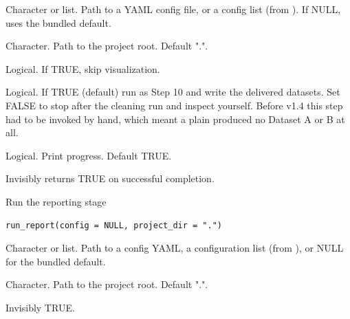 \documentclass[a4paper]{book}
\begin{document}
%
\begin{Arguments}
\begin{ldescription}
\item[\code{config}] Character or list. Path to a YAML config file, or a config
list (from ). If NULL, uses the bundled default.

\item[\code{project\_dir}] Character. Path to the project root. Default ".".

\item[\code{skip\_visualization}] Logical. If TRUE, skip visualization.

\item[\code{finalize}] Logical. If TRUE (default) run  as
Step 10 and write the delivered datasets. Set FALSE to stop after the
cleaning run and inspect  yourself. Before v1.4
this step had to be invoked by hand, which meant a plain
 produced no Dataset A or B at all.

\item[\code{verbose}] Logical. Print progress. Default TRUE.
\end{ldescription}
\end{Arguments}
%
\begin{Value}
Invisibly returns TRUE on successful completion.
\end{Value}
%
\begin{Description}
Run the reporting stage
\end{Description}
%
\begin{Usage}
\begin{verbatim}
run_report(config = NULL, project_dir = ".")
\end{verbatim}
\end{Usage}
%
\begin{Arguments}
\begin{ldescription}
\item[\code{config}] Character or list. Path to a config YAML, a configuration
list (from ), or NULL for the bundled default.

\item[\code{project\_dir}] Character. Path to the project root. Default ".".
\end{ldescription}
\end{Arguments}
%
\begin{Value}
Invisibly TRUE.
\end{Value}
\end{document}
